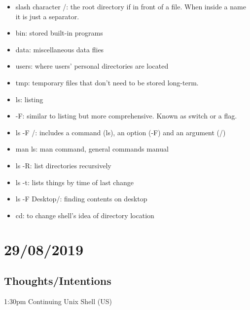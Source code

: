 \documentclass{article}
\begin{document}
\begin{itemize}
\item slash character /: the root directory if in front of a file. When inside a name it is just a separator.
\item bin: stored built-in programs
\item data: miscellaneous data flies
\item users: where users' personal directories are located
\item tmp: temporary files that don't need to be stored long-term.
\item ls: listing 
\item -F: similar to listing but more comprehensive. Known as switch or a flag.
\item ls -F /: includes a command (ls), an option (-F) and an argument (/)
\item man ls: man command, general commands manual
\item ls -R: list directories recursively
\item ls -t: lists things by time of last change 
\item ls -F Desktop/: finding contents on desktop
\item cd: to change shell's idea of directory location
\end{itemize}

\section{29/08/2019}
\subsection{Thoughts/Intentions}
1:30pm Continuing Unix Shell (US)
\end{document}
